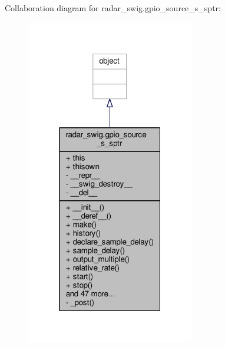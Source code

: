 Collaboration diagram for radar\+\_\+swig.\+gpio\+\_\+source\+\_\+s\+\_\+sptr\+:
\nopagebreak
\begin{figure}[H]
\begin{center}
\leavevmode
\includegraphics[width=208pt]{d8/d94/classradar__swig_1_1gpio__source__s__sptr__coll__graph}
\end{center}
\end{figure}
